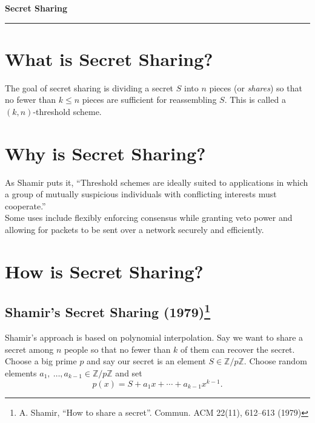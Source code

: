 \documentclass[12pt]{article}
\newcommand{\integers}{\mathbb{Z}}
\begin{document}
\begin{center}
{\bf \Large Secret Sharing}
\vspace{0.2cm}
\hrule
\end{center}

\section*{What is Secret Sharing?}
The goal of secret sharing is dividing a secret $S$ into $n$ pieces (or \textit{shares}) so that no fewer than $k\leq n$ pieces are sufficient for reassembling $S$. This is called a $(k,n)$-threshold scheme.

\section*{Why is Secret Sharing?}
As Shamir puts it, ``Threshold schemes are ideally suited to applications in which a group of mutually suspicious individuals with conflicting interests must cooperate.''\\

Some uses include flexibly enforcing consensus while granting veto power and allowing for packets to be sent over a network securely and efficiently.


\section*{How is Secret Sharing?}
\subsection*{Shamir's Secret Sharing (1979)\footnote{A. Shamir, ``How to share a secret''. Commun. ACM 22(11), 612–613 (1979)}}
Shamir's approach is based on polynomial interpolation. Say we want to share a secret among $n$ people so that no fewer than $k$ of them can recover the secret. Choose a big prime $p$ and say our secret is an element $S\in \integers/p\integers$. Choose random elements $a_1,\ \ldots, a_{k-1}\in \integers/p\integers$ and set
\[
p(x) = S + a_1x + \cdots + a_{k-1}x^{k-1}.
\]
\end{document}
